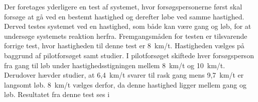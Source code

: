 Der foretages yderligere en test af systemet, hvor forsøgspersonerne først skal forsøge at gå ved en bestemt hastighed og derefter løbe ved samme hastighed. Derved testes systemet ved en hastighed, som både kan være gang og løb, for at undersøge systemets reaktion herfra. Fremgangsmåden for testen er tilsvarende forrige test, hvor hastigheden til denne test er 8~km/t. Hastigheden vælges på baggrund af pilotforsøget samt studier. I pilotforsøget skiftede hver forsøgsperson fra gang til løb under hastighedsstigningen mellem 8~km/t og 10~km/t. Derudover hævder studier, at 6,4~km/t svarer til rask gang mens 9,7~km/t er langsomt løb. 8~km/t vælges derfor, da denne hastighed ligger mellem gang og løb. \citep{Miles2007} Resultatet fra denne test ses i 
\begin{table}[H]
	\centering
\end{table}
